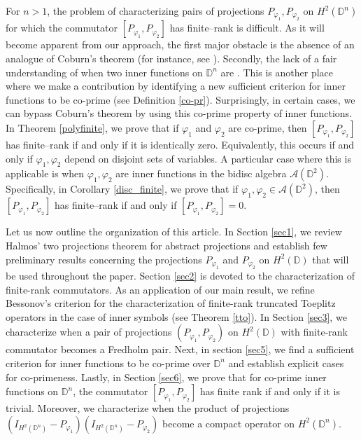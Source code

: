 \documentclass[12pt, a4 paper]{amsart}
\newcommand{\D}{\mathbb{D}}
\theoremstyle{definition}
\theoremstyle{plain}
\theoremstyle{definition}
\numberwithin{equation}{section}
\let\phi=\varphi
\begin{document}
For $n>1$, the problem of characterizing pairs of projections $P_{\phi_1}, P_{\phi_2}$ on $H^2(\D^n)$ for which the commutator $[P_{\phi_1},P_{\phi_2}]$ has finite--rank is difficult. As it will become apparent from our approach, the first major obstacle is the absence of an analogue of Coburn's theorem (for instance, see \cite{CIL}). Secondly, the lack of a fair understanding of when two inner functions on $\D^n$ are . This is another place where we make a contribution by identifying a new sufficient criterion for inner functions to be co-prime (see Definition \ref{co-pr}). Surprisingly, in certain cases, we can bypass Coburn's theorem by using this co-prime property of inner functions. In Theorem \ref{polyfinite}, we prove that if $\phi_1$ and $\phi_2$ are co-prime, then $[P_{\phi_1}, P_{\phi_2}]$ has finite--rank if and only if it is identically zero. Equivalently, this occurs if and only if $ \phi_1,\phi_2$ depend on disjoint sets of variables. A particular case where this is applicable is when $\phi_1, \phi_2$ are inner functions in the bidisc algebra $\mathcal{A}(\D^2)$. Specifically, in Corollary \ref{disc_finite}, we prove that if $\phi_1, \phi_2 \in \mathcal{A}(\D^2)$, then $[P_{\phi_1}, P_{\phi_2}]$ has finite--rank if and only if $[P_{\phi_1}, P_{\phi_2}]=0$. 

Let us now outline the organization of this article. In Section \ref{sec1}, we review Halmos' two projections theorem for abstract projections and establish few preliminary results concerning the projections $P_{\phi_1}$ and $P_{\phi_2}$ on $H^2(\D)$ that will be used throughout the paper. Section \ref{sec2} is devoted to the characterization of finite-rank commutators. As an application of our main result, we refine Bessonov's criterion \cite{RV} for the characterization of finite-rank truncated Toeplitz operators in the case of inner symbols (see Theorem \ref{tto}). In Section \ref{sec3}, we characterize when a pair of projections $(P_{\phi_1},P_{\phi_2})$ on $H^2(\D)$ with finite-rank commutator becomes a Fredholm pair. Next, in section \ref{sec5}, we find a sufficient criterion for inner functions to be co-prime over $\D^n$ and establish explicit cases for co-primeness. Lastly, in Section \ref{sec6}, we prove that for co-prime inner functions on $\D^n$, the commutator $[P_{\phi_1}, P_{\phi_2}]$ has finite rank if and only if it is trivial. Moreover, we characterize when the product of projections $(I_{H^2(\D^n)} - P_{\phi_1}) (I_{H^2(\D^n)} - P_{\phi_2})$ become a compact operator on $H^2(\D^n)$.
\end{document}
